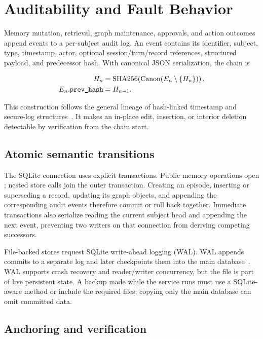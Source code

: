 \section{Auditability and Fault Behavior}
\label{sec:audit}

Memory mutation, retrieval, graph maintenance, approvals, and action outcomes append events to a per-subject audit log. An event contains its identifier, subject, type, timestamp, actor, optional session/turn/record references, structured payload, and predecessor hash. With canonical JSON serialization, the chain is

\begin{equation}
\begin{aligned}
H_n&=\operatorname{SHA256}\!\left(\operatorname{Canon}(E_n\setminus\{H_n\})\right),\\
E_n.\texttt{prev\_hash}&=H_{n-1}.
\end{aligned}
\label{eq:audit-chain}
\end{equation}

This construction follows the general lineage of hash-linked timestamp and secure-log structures~\cite{haber1991timestamp,schneier1998securelogs}. It makes an in-place edit, insertion, or interior deletion detectable by verification from the chain start.

\subsection{Atomic semantic transitions}

The SQLite connection uses explicit transactions. Public memory operations open ; nested store calls join the outer transaction. Creating an episode, inserting or superseding a record, updating its graph objects, and appending the corresponding audit events therefore commit or roll back together. Immediate transactions also serialize reading the current subject head and appending the next event, preventing two writers on that connection from deriving competing successors.

File-backed stores request SQLite write-ahead logging (WAL). WAL appends commits to a separate log and later checkpoints them into the main database~\cite{sqlitewal}. WAL supports crash recovery and reader/writer concurrency, but the  file is part of live persistent state. A backup made while the service runs must use a SQLite-aware method or include the required files; copying only the main database can omit committed data.

\subsection{Anchoring and verification}

